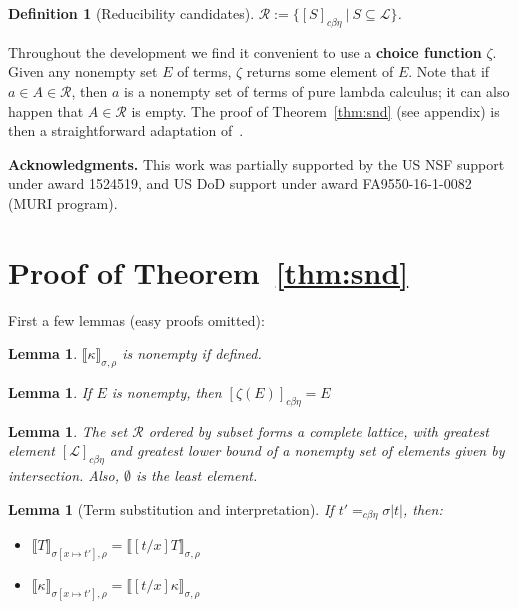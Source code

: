 \documentclass{article}
\newcommand{\choice}[0]{\zeta}
\newcommand{\interp}[1]{\llbracket #1 \rrbracket}
\newcommand{\cbe}[0]{c\beta\eta}
\newtheorem{definition}[theorem]{Definition}
\newtheorem{lemma}[theorem]{Lemma}
\begin{document}
\begin{definition}[Reducibility candidates]
  $\mathcal{R} := \{ [S]_{\cbe}\ |\ S\subseteq \mathcal{L} \}$.
\end{definition}

Throughout the development we find it convenient to use a
\textbf{choice function} $\choice$.  Given any nonempty set $E$ of
terms, $\choice$ returns some element of $E$.  Note that if $a \in A
\in \mathcal{R}$, then $a$ is a nonempty set of terms of pure lambda
calculus; it can also happen that $A \in\mathcal{R}$ is empty.  The
proof of Theorem~\ref{thm:snd} (see appendix) is then a straightforward adaptation of~\cite{stump17}. 

\textbf{Acknowledgments.}  This work was partially supported by the US
NSF support under award 1524519, and US DoD support under award
FA9550-16-1-0082 (MURI program).






\appendix

\section{Proof of Theorem~\ref{thm:snd}}

First a few lemmas (easy proofs omitted):

\begin{lemma}
  $\interp{\kappa}_{\sigma,\rho}$ is nonempty if defined.
\end{lemma}

\begin{lemma}
\label{lem:choice}
If $E$ is nonempty, then $[\choice(E)]_{\cbe} = E$
\end{lemma}

\begin{lemma}
  The set $\mathcal{R}$ ordered by subset forms a complete lattice,
  with greatest element $[\mathcal{L}]_{\cbe}$ and greatest lower bound
  of a nonempty set of elements given by
  intersection.  Also, $\emptyset$ is the least element.
\end{lemma}

\begin{lemma}[Term substitution and interpretation]
\label{lem:termsubstinterp}
If $t' =_{\cbe} \sigma |t|$, then: 
\begin{itemize}
\item $\interp{T}_{\sigma[x\mapsto t'],\rho} = \interp{[t/x]T}_{\sigma,\rho}$
\item $\interp{\kappa}_{\sigma[x\mapsto t'],\rho} = \interp{[t/x]\kappa}_{\sigma,\rho}$
\end{itemize}
\end{lemma}
\end{document}
